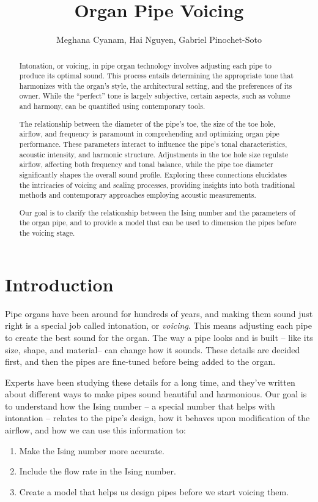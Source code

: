 \documentclass{psu-plan}
\title{Organ Pipe Voicing}
\author{ Meghana Cyanam, Hai Nguyen, Gabriel Pinochet-Soto }
\begin{document}
\maketitle

\begin{abstract}
    Intonation, or voicing, in pipe organ technology involves adjusting each
    pipe to produce its optimal sound.
    This process entails determining the appropriate tone that harmonizes with
    the organ’s style, the architectural setting, and the preferences of its
    owner.
    While the “perfect” tone is largely subjective, certain aspects, such as 
    volume and harmony, can be quantified using contemporary tools.
    
    The relationship between the diameter of the pipe’s toe, the size of the toe
    hole, airflow, and frequency is paramount in comprehending and optimizing
    organ pipe performance.
    These parameters interact to influence the pipe’s tonal characteristics,
    acoustic intensity, and harmonic structure. Adjustments in the toe hole size
    regulate airflow, affecting both frequency and tonal balance, while the pipe
    toe diameter significantly shapes the overall sound profile.
    Exploring these connections elucidates the intricacies of voicing and 
    scaling processes, providing insights into both traditional methods and
    contemporary approaches employing acoustic measurements.

    Our goal is to clarify the relationship between the Ising number and the
    parameters of the organ pipe, and to provide a model that can be used to
    dimension the pipes before the voicing stage.
\end{abstract}


\section{Introduction}

Pipe organs have been around for hundreds of years, and making them sound just
right is a special job called intonation, or \emph{voicing}.
This means adjusting each pipe to create the best sound for the organ.
The way a pipe looks and is built -- like its size, shape, and material-- can
change how it sounds.
These details are decided first, and then the pipes are fine-tuned before being
added to the organ.

Experts have been studying these details for a long time, and they’ve written
about different ways to make pipes sound beautiful and harmonious.
Our goal is to understand how the Ising number -- a special number that helps
with intonation -- relates to the pipe’s design, how it behaves upon modification of
the airflow, and how we can use this information to:
\begin{enumerate}
    \item Make the Ising number more accurate.
    \item Include the flow rate in the Ising number.
    \item Create a model that helps us design pipes before we start voicing them.
\end{enumerate}
\end{document}
